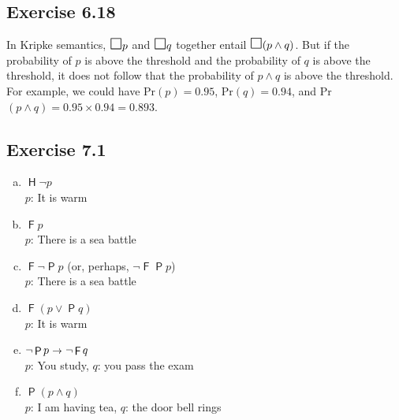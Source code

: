 \documentclass{scrartcl}
\let\oldbox\Box
\renewcommand\Box{\scaleobj{1.2}{\oldbox}}
\let\oldto\to
\renewcommand\to{\scaleobj{0.95}{\,\oldto\,}}
\DeclareMathOperator{\tP}{\mathsf{P}}
\DeclareMathOperator{\tF}{\mathsf{F}}
\DeclareMathOperator{\tH}{\mathsf{H}}
\begin{document}
  \subsection*{Exercise 6.18}

%
%
  In Kripke semantics, $\Box p$ and $\Box q$ together entail $\Box(p \land
  q)$. But if the probability of $p$ is above the threshold and the probability
  of $q$ is above the threshold, it does not follow that the probability of
  $p\land q$ is above the threshold. For example, we could have Pr$(p)=0.95$,
  Pr$(q)=0.94$, and Pr$(p \land q) = 0.95 \times 0.94 = 0.893$.

  \subsection*{Exercise 7.1}

%
%
  \begin{enumerate}[(a)]
  \item $\tH \neg p$\\
    $p$: It is warm\\[-2mm]
  \item $\tF p$\\
    $p$: There is a sea battle\\[-2mm]
  \item $\tF\neg \tP p$ (or, perhaps, $\neg \tF \tP p$)\\
    $p$: There is a sea battle\\[-2mm]
  \item  $\tF(p \lor \tP q)$\\
    $p$: It is warm\\[-2mm]
  \item $\neg \tP p \to \neg \tF q$\\
    $p$: You study, $q$: you pass the exam\\[-2mm]
  \item $\tP(p \land q)$\\
    $p$: I am having tea, $q$: the door bell rings
  \end{enumerate}
\end{document}
